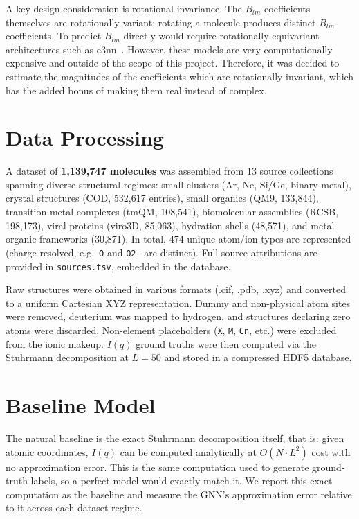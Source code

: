 \documentclass[final]{article}
\begin{document}
A key design consideration is rotational invariance. The $B_{lm}$ coefficients themselves
are rotationally variant; rotating a molecule produces distinct $B_{lm}$ coefficients. 
To predict $B_{lm}$ directly would require rotationally equivariant architectures 
such as e3nn~\cite{e3nn}. However, these models are very computationally expensive and outside of the scope 
of this project. Therefore, it was decided to estimate the magnitudes of the coefficients which are rotationally 
invariant, which has the added bonus of making them real instead of complex.

\section{Data Processing}

A dataset of \textbf{1,139,747 molecules} was assembled from 13 source collections spanning
diverse structural regimes: small clusters (Ar, Ne, Si/Ge, binary metal), crystal structures
(COD, 532,617 entries), small organics (QM9, 133,844), transition-metal complexes
(tmQM, 108,541), biomolecular assemblies (RCSB, 198,173), viral proteins
(viro3D, 85,063), hydration shells (48,571), and metal-organic frameworks (30,871).
In total, 474 unique atom/ion types are represented (charge-resolved, e.g.\ \texttt{O} and
\texttt{O2-} are distinct). Full source attributions are provided in \texttt{sources.tsv},
embedded in the database.

Raw structures were obtained in various formats (.cif, .pdb, .xyz\@) and converted to a
uniform Cartesian XYZ representation. Dummy and non-physical atom sites were removed,
deuterium was mapped to hydrogen, and structures declaring zero atoms were discarded.
Non-element placeholders (\texttt{X}, \texttt{M}, \texttt{Cn}, etc.) were excluded from
the ionic makeup. $I(q)$ ground truths were then computed via the Stuhrmann decomposition
at $L{=}50$ and stored in a compressed HDF5 database.

\section{Baseline Model}

The natural baseline is the exact Stuhrmann decomposition itself, that is: given atomic coordinates,
$I(q)$ can be computed analytically at $O(N \cdot L^2)$ cost with no approximation error.
This is the same computation used to generate ground-truth labels, so a perfect model would
exactly match it. We report this exact computation as the baseline and measure the GNN's
approximation error relative to it across each dataset regime.
\end{document}
